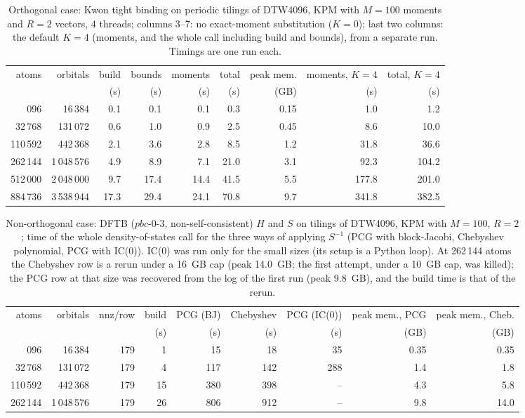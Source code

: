 \begin{table}[t]\caption{Orthogonal case: Kwon tight binding on periodic tilings of DTW4096, KPM with $M=100$ moments and $R=2$ vectors, 4 threads; columns 3--7: no exact-moment substitution ($K=0$); last two columns: the default $K=4$ (moments, and the whole call including build and bounds), from a separate run. Timings are one run each.}\label{tab:kw}\begin{ruledtabular}\begin{tabular}{rrrrrrrrr}
atoms & orbitals & build & bounds & moments & total & peak mem. & moments, $K=4$ & total, $K=4$ \\ & & (s) & (s) & (s) & (s) & (GB) & (s) & (s) \\ \colrule
4\,096 & 16\,384 & 0.1 & 0.1 & 0.1 & 0.3 & 0.15 & 1.0 & 1.2 \\
32\,768 & 131\,072 & 0.6 & 1.0 & 0.9 & 2.5 & 0.45 & 8.6 & 10.0 \\
110\,592 & 442\,368 & 2.1 & 3.6 & 2.8 & 8.5 & 1.2 & 31.8 & 36.6 \\
262\,144 & 1\,048\,576 & 4.9 & 8.9 & 7.1 & 21.0 & 3.1 & 92.3 & 104.2 \\
512\,000 & 2\,048\,000 & 9.7 & 17.4 & 14.4 & 41.5 & 5.5 & 177.8 & 201.0 \\
884\,736 & 3\,538\,944 & 17.3 & 29.4 & 24.1 & 70.8 & 9.7 & 341.8 & 382.5 \\
\end{tabular}\end{ruledtabular}\end{table}

\begin{table}[t]\caption{Non-orthogonal case: DFTB ($pbc$-0-3, non-self-consistent) $H$ and $S$ on tilings of DTW4096, KPM with $M=100$, $R=2$; time of the whole density-of-states call for the three ways of applying $S^{-1}$ (PCG with block-Jacobi, Chebyshev polynomial, PCG with IC(0)). IC(0) was run only for the small sizes (its setup is a Python loop). At 262\,144 atoms the Chebyshev row is a rerun under a 16~GB cap (peak 14.0~GB; the first attempt, under a 10~GB cap, was killed); the PCG row at that size was recovered from the log of the first run (peak 9.8~GB), and the build time is that of the rerun.}\label{tab:sk}\begin{ruledtabular}\begin{tabular}{rrrrrrrrr}
atoms & orbitals & nnz/row & build & PCG (BJ) & Chebyshev & PCG (IC(0)) & peak mem., PCG & peak mem., Cheb. \\ & & & (s) & (s) & (s) & (s) & (GB) & (GB) \\ \colrule
4\,096 & 16\,384 & 179 & 1 & 15 & 18 & 35 & 0.35 & 0.35 \\
32\,768 & 131\,072 & 179 & 4 & 117 & 142 & 288 & 1.4 & 1.8 \\
110\,592 & 442\,368 & 179 & 15 & 380 & 398 & -- & 4.3 & 5.8 \\
262\,144 & 1\,048\,576 & 179 & 26 & 806 & 912 & -- & 9.8 & 14.0 \\
\end{tabular}\end{ruledtabular}\end{table}


